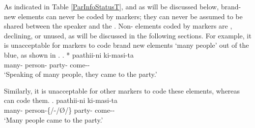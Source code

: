 As indicated in Table \ref{ParInfoStatusT}, and as will be discussed below,
brand-new elements can never be coded by  markers;
they can never be assumed to be shared between the speaker and the .
Non- elements coded by  markers are
, declining, or unused,
as will be discussed in the following sections.
For example, it is unacceptable for  markers to code brand new elements  `many people' out of the blue, as shown in \Next.
%
\exg.
 *  paathii-ni ki-masi-ta \\
  many- person- party- come-- \\
  `Speaking of many people, they came to the party.'
    \hfill{\cite[~45]{kuno73}}

\largerpage
Similarly, it is unacceptable for other  markers to code these elements, whereas  can code them.
%
\exg.
   paathii-ni ki-masi-ta \\
 many- person-{\{/-/{\O}/\}} party- come-- \\
 `Many people came to the party.'



